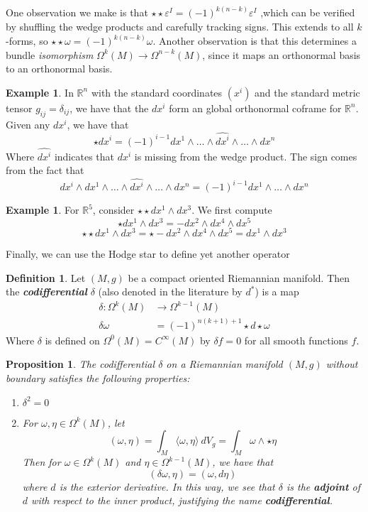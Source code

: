 \documentclass[psamsfonts]{amsart}
\newtheorem{prop}[thm]{Proposition}
\theoremstyle{definition}
\newtheorem{defn}[thm]{Definition}
\newtheorem{exmp}[thm]{Example}
\theoremstyle{remark}
\newcommand{\R}{\mathbb{R}}
\newcommand{\ib}[1]{\textbf{\textit{#1}}}
\begin{document}
One observation we make is that $\star\star \varepsilon^I = (-1)^{k(n-k)}\varepsilon^I$ ,which can be verified by shuffling the wedge products and carefully tracking signs. This extends to all $k$-forms, so $\star \star\omega = (-1)^{k(n-k)}\omega$. Another observation is that this determines a bundle \emph{isomorphism} $\Omega^k(M) \to \Omega^{n-k}(M)$, since it maps an orthonormal basis to an orthonormal basis.
\begin{exmp}
In $\R^n$ with the standard coordinates $(x^i)$ and the standard metric tensor  $g_{ij} = \delta_{ij}$, we have that the $dx^i$ form an global orthonormal coframe for $\R^n$. Given any $dx^i$, we have that 
$$\star dx^i =  (-1)^{i-1} dx^1 \wedge \ldots \wedge \hat{dx^i} \wedge \ldots \wedge dx^n $$
Where $\hat{dx^i}$ indicates that $dx^i$ is missing  from the wedge product. The sign comes from the fact that 
$$dx^i \wedge dx^1 \wedge \ldots \wedge \hat{dx^i} \wedge \ldots \wedge dx^n = (-1)^{i-1} dx^1\wedge \ldots \wedge dx^n$$
\end{exmp}
%
\begin{exmp}
For $\R^5$,  consider $\star\star dx^1 \wedge dx^3$. We first compute
$$\star dx^1 \wedge dx^3 = -dx^2 \wedge dx^4 \wedge dx^5 $$
$$\star\star dx^1\wedge dx^3 = \star -dx^2 \wedge dx^4 \wedge dx^5 = dx^1 \wedge dx^3$$
\end{exmp}
%
Finally, we can use the Hodge star to define yet another operator
\begin{defn}
Let $(M,g)$ be a compact oriented Riemannian manifold. Then the \ib{codifferential} $\delta$ (also denoted in the literature by $d^*$) is a map
\begin{align*}
\delta: \Omega^k(M) &\to \Omega^{k-1}(M) \\
\delta \omega &= (-1)^{n(k+1)+1}\star d \star \omega
\end{align*}
Where $\delta$ is  defined on $\Omega^0(M) = C^\infty(M)$ by  $\delta f = 0$ for all smooth functions $f$.
\end{defn}
%
\begin{prop}
The codifferential $\delta$ on  a Riemannian manifold $(M,g)$ without boundary satisfies the following properties:
\begin{enumerate}
\item $\delta^2 = 0$ 
\item For $\omega,\eta \in \Omega^k(M)$, let 
$$(\omega, \eta) = \int_M \langle \omega, \eta \rangle ~dV_g = \int_M \omega \wedge \star \eta$$
Then for $\omega \in \Omega^k(M)$ and $\eta \in \Omega^{k-1}(M)$, we have that 
$$(\delta \omega, \eta) = (\omega, d\eta) $$
where $d$ is the exterior derivative. In this way, we see that $\delta$  is the \ib{adjoint} of $d$ with respect to the inner product, justifying the name \ib{codifferential}.
\end{enumerate}
\end{prop}
\end{document}
